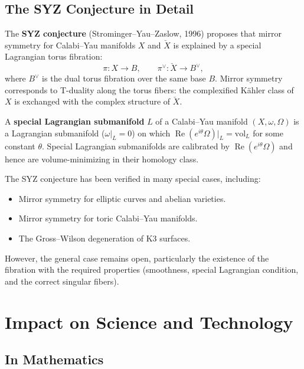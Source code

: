 \subsection{The SYZ Conjecture in Detail}

The \textbf{SYZ conjecture} (Strominger--Yau--Zaslow, 1996) proposes that mirror symmetry for Calabi--Yau manifolds $X$ and $\check X$ is explained by a special Lagrangian torus fibration:
\[
\pi: X \to B, \qquad \pi^\vee: \check X \to B^\vee,
\]
where $B^\vee$ is the dual torus fibration over the same base $B$. Mirror symmetry corresponds to T-duality along the torus fibers: the complexified K\"ahler class of $X$ is exchanged with the complex structure of $\check X$.

A \textbf{special Lagrangian submanifold} $L$ of a Calabi--Yau manifold $(X, \omega, \Omega)$ is a Lagrangian submanifold ($\omega|_L = 0$) on which $\operatorname{Re}(e^{i\theta}\Omega)|_L = \text{vol}_L$ for some constant $\theta$. Special Lagrangian submanifolds are calibrated by $\operatorname{Re}(e^{i\theta}\Omega)$ and hence are volume-minimizing in their homology class.

The SYZ conjecture has been verified in many special cases, including:
\begin{itemize}
    \item Mirror symmetry for elliptic curves and abelian varieties.
    \item Mirror symmetry for toric Calabi--Yau manifolds.
    \item The Gross--Wilson degeneration of K3 surfaces.
\end{itemize}

However, the general case remains open, particularly the existence of the fibration with the required properties (smoothness, special Lagrangian condition, and the correct singular fibers).

\section{Impact on Science and Technology}

\subsection{In Mathematics}

